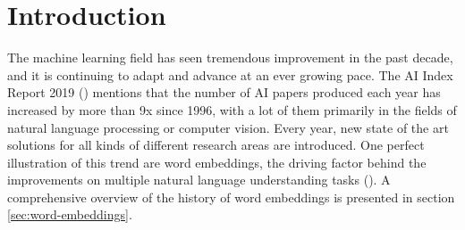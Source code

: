 \documentclass[12pt]{extreport}
\begin{document}
\tableofcontents

\listoffigures

\listoftables

\chapter{Introduction} \label{sec:intro}

The machine learning field has seen tremendous improvement in the past decade, and it is continuing to adapt and advance at an ever growing pace. The AI Index Report 2019 (\cite{aiindex2019}) mentions that the number of AI papers produced each year has increased by more than 9x since 1996, with a lot of them primarily in the fields of natural language processing or computer vision. Every year, new state of the art solutions for all kinds of different research areas are introduced. One perfect illustration of this trend are word embeddings, the driving factor behind the improvements on multiple natural language understanding tasks (\cite{dissecting}). A comprehensive overview of the history of word embeddings is presented in section \ref{sec:word-embeddings}.
\end{document}
